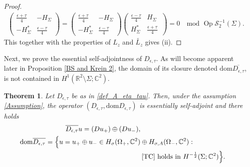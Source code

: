 \documentclass[11pt,a4paper,reqno,oneside]{amsproc}
\DeclareMathOperator{\dom}{dom}
\DeclareMathOperator{\Op}{Op}
\newcommand{\cS}{\mathcal{S}}
\def \rr {{\mathbb R}}
\def \cc {{\mathbb C}}
\numberwithin{equation}{section}
\def\dom{\mathrm{dom}}
\def \cc {{\mathbb{C}}}
\newtheorem{theorem}[definition]{Theorem}
\begin{document}
\begin{proof}
\begin{align*}
\begin{pmatrix}
	      \frac{\epsilon +\tau}{4} & -H_\Sigma\\ 
	-H^*_\Sigma & \frac{\epsilon-\tau}{4}  \, 
	   \end{pmatrix}= \begin{pmatrix} 
	   \frac{\epsilon +\tau}{4} & -H_\Sigma\\ 
	   -H^*_\Sigma & \frac{\epsilon-\tau}{4}  \, 
	   \end{pmatrix}\begin{pmatrix} 
	   \frac{\epsilon -\tau}{4} & H_\Sigma\\ 
	   H^*_\Sigma & \frac{\epsilon +\tau}{4}  \, 
	   \end{pmatrix}  =  0 \quad \mathrm{ mod }\,\,  \Op \cS^{-1}_2(\Sigma).
\end{align*}
This together with the properties of $L_z$ and $ \widetilde{L_z}$ gives (ii).   
\end{proof}


 Next, we prove the essential self-adjointness of $D_{\epsilon,\tau}$. As will become apparent later in Proposition \ref{BS and Krein 2}, the domain of its closure denoted $\dom \overline{D_{\epsilon,\tau}}$, is not contained in  $H^1(\rr^2\setminus\Sigma;\cc^2)$.

\begin{theorem}\label{main_th2} Let $D_{\epsilon,\tau}$  be as in \eqref{def_A_eta_tau}. Then, under the assumption  \eqref{Assumption},  the operator $(D_{\epsilon,\tau},\dom D_{\epsilon,\tau})$ is essentially self-adjoint and there holds 
\begin{equation*} 
		\begin{split}
			\overline{D_{\epsilon,\tau}}u = (D u_+) \oplus (D u_-), \\
			\dom \overline{D_{\epsilon,\tau}} = \Big\{ u = u_+ \oplus u_- \in  H_\sigma(\Omega_+,\cc^2)&\oplus H_{\sigma, A}(\Omega_-,\cc^2): \\
           &\, \eqref{TC} \text{ holds in } H^{-\frac{1}{2}}(\Sigma;\cc^2) \Big\}.
		\end{split}
	\end{equation*}
\end{theorem}
    
\end{document}
